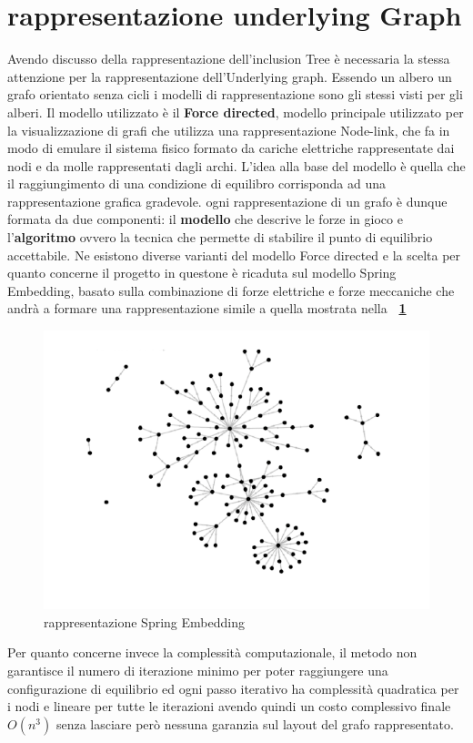 {\section{rappresentazione underlying Graph}
Avendo discusso della rappresentazione dell'inclusion Tree è necessaria la stessa attenzione per la rappresentazione dell'Underlying graph.  Essendo un albero un grafo orientato senza cicli i modelli di rappresentazione sono gli stessi visti per gli alberi. Il modello utilizzato è il \textbf{Force directed}, modello principale utilizzato per la visualizzazione di grafi che utilizza una rappresentazione Node-link, che fa in modo di emulare il sistema fisico formato da cariche elettriche rappresentate dai nodi e da molle rappresentati dagli archi. L'idea alla base del modello è quella che il raggiungimento di una condizione di equilibro corrisponda ad una rappresentazione grafica gradevole. ogni rappresentazione di un grafo è dunque formata da due componenti: il \textbf{modello} che descrive le forze in gioco e l'\textbf{algoritmo} ovvero la tecnica che permette di stabilire il punto di equilibrio accettabile. Ne esistono diverse varianti del modello Force directed e la scelta per quanto concerne il progetto in questone è ricaduta sul modello Spring Embedding, basato sulla combinazione di forze elettriche e forze meccaniche che andrà a formare una rappresentazione simile a quella mostrata nella \textbf{\figurename~\ref{fig:spring}}   
\begin{figure}[!htb]
	\begin{center}
		\includegraphics[width=0.8 \linewidth]{figure/spring}
	\end{center}
	\caption{rappresentazione Spring Embedding\label{fig:spring}}
\end{figure}
Per quanto concerne invece la complessità computazionale, il metodo non garantisce il numero di iterazione minimo per poter raggiungere una configurazione di equilibrio ed ogni passo iterativo ha complessità quadratica per i nodi e lineare per tutte le iterazioni avendo quindi un costo complessivo finale $O(n^3)$ senza lasciare però nessuna garanzia sul layout del grafo rappresentato.

}
